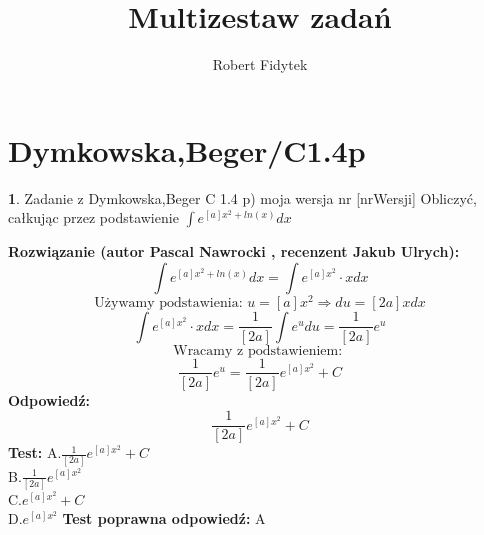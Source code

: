 \documentclass[12pt, a4paper]{article}
\title{Multizestaw zadań}
\author{Robert Fidytek}
\date{}
\theoremstyle{definition} %
\newtheorem{zad}{}
\newcommand{\kategoria}[1]{\section{#1}} %
\newcommand{\zadStart}[1]{\begin{zad}#1\newline} %
\newcommand{\zadStop}{\end{zad}}   %
\newcommand{\rozwStart}[2]{\noindent \textbf{Rozwiązanie (autor #1 , recenzent #2): }\newline} %
\newcommand{\odpStart}{\noindent \textbf{Odpowiedź:}\newline}    %
\newcommand{\odpStop}{\newline}                                             %
\newcommand{\testStart}{\noindent \textbf{Test:}\newline} %
\newcommand{\testStop}{\newline} %
\newcommand{\kluczStart}{\noindent \textbf{Test poprawna odpowiedź:}\newline} %
\newcommand{\kluczStop}{\newline} %
\begin{document}
\maketitle



\kategoria{Dymkowska,Beger/C1.4p}
\zadStart{Zadanie z Dymkowska,Beger C 1.4 p) moja wersja nr [nrWersji]}
Obliczyć, całkując przez podstawienie $\displaystyle \int e^{[a]x^{2}+ln(x)}dx$
\zadStop
\rozwStart{Pascal Nawrocki}{Jakub Ulrych}
$$\displaystyle \int e^{[a]x^{2}+ln(x)}dx=\displaystyle \int e^{[a]x^{2}}\cdot xdx$$
$$\text{Używamy podstawienia: }u=[a]x^{2}\Rightarrow du=[2a]xdx$$
$$\displaystyle \int e^{[a]x^{2}}\cdot xdx=\displaystyle \frac{1}{[2a]}\int e^{u}du=\frac{1}{[2a]}e^{u}$$
$$\text{Wracamy z podstawieniem: }$$
$$\frac{1}{[2a]}e^{u}=\frac{1}{[2a]}e^{[a]x^{2}}+C$$
\odpStart
$$\frac{1}{[2a]}e^{[a]x^{2}}+C$$
\odpStop
\testStart
A.$\frac{1}{[2a]}e^{[a]x^{2}}+C$
\\
B.$\frac{1}{[2a]}e^{[a]x^{2}}$
\\
C.$e^{[a]x^{2}}+C$
\\
D.$e^{[a]x^{2}}$
\testStop
\kluczStart
A
\kluczStop
\end{document}
